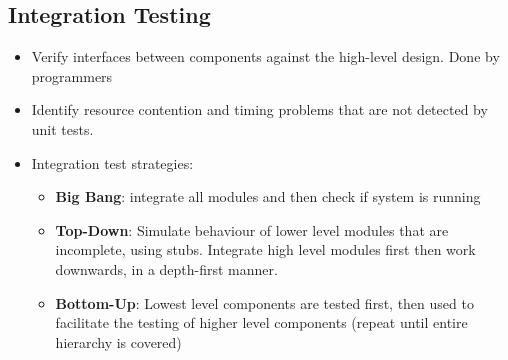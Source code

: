\documentclass{article}
\begin{document}
\subsection{Integration Testing}
\begin{itemize}
    \item Verify interfaces between components against the high-level design. Done by programmers
    
    \item Identify resource contention and timing problems that are not detected by unit tests. 
    
    \item Integration test strategies:
    \begin{itemize}
        \item \textbf{Big Bang}: integrate all modules and then check if system is running
        
        \item \textbf{Top-Down}: Simulate behaviour of lower level modules that are incomplete, using stubs. Integrate high level modules first then work downwards, in a depth-first manner. 
        
        \item \textbf{Bottom-Up}: Lowest level components are tested first, then used to facilitate the testing of higher level components (repeat until entire hierarchy is covered)
    \end{itemize}
\end{itemize} 
\end{document}
